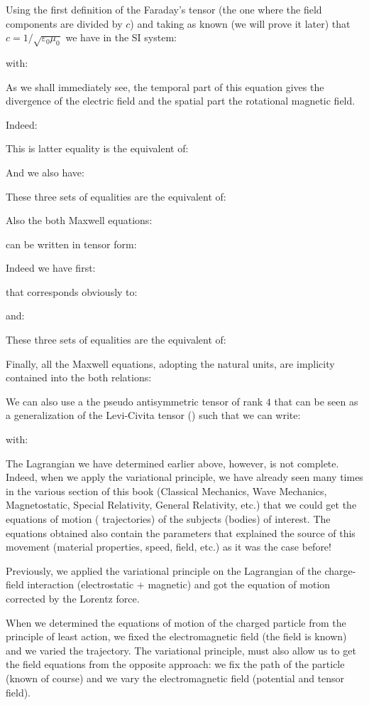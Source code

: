 	Using the first definition of the Faraday's tensor (the one where the field components are divided by $c$) and taking as known (we will prove it later) that $c=1/\sqrt{\varepsilon_0\mu_0}$ we have in the SI system:
	
	with:
	
	As we shall immediately see, the temporal part of this equation gives the divergence of the electric field and the spatial part the rotational magnetic field.
	
	Indeed:
	
	This is latter equality is the equivalent of:
	
	And we also have:
	
	These three sets of equalities are the equivalent of:
	
	Also the both Maxwell equations:
	
	can be written in tensor form:
	
	Indeed we have first:
	
	that corresponds obviously to:
	
	and:
	
	These three sets of equalities are the equivalent of:
	
	Finally, all the Maxwell equations, adopting the natural units, are implicity contained into the both relations:
	
	We can also use a the pseudo antisymmetric tensor of rank $4$ that can be seen as a generalization of the Levi-Civita tensor () such that we can write:
	
	with:
	
	The Lagrangian we have determined earlier above, however, is not complete. Indeed, when we apply the variational principle, we have already seen many times in the various section of this book (Classical Mechanics, Wave  Mechanics, Magnetostatic, Special Relativity, General Relativity, etc.) that we could get the equations of motion ( trajectories) of the subjects (bodies) of interest. The equations obtained also contain the parameters that explained the source of this movement (material properties, speed, field, etc.) as it was the case before!

	Previously, we applied the variational principle on the Lagrangian of the charge-field interaction (electrostatic + magnetic) and got the equation of motion corrected by the Lorentz force.

	When we determined the equations of motion of the charged particle from the principle of least action, we fixed the electromagnetic field (the field is known) and we varied the trajectory. The variational principle, must also allow us to get the field equations from the opposite approach: we fix the path of the particle (known of course) and we vary the electromagnetic field (potential and tensor field).

